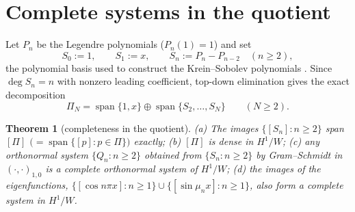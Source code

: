 ﻿\documentclass[11pt]{article}
\newtheorem{theorem}{Theorem}[section]
\begin{document}
\section{Complete systems in the quotient}

Let $P_n$ be the Legendre polynomials ($P_n(1)=1$) and set
\begin{equation*}
	S_0:=1,\qquad S_1:=x,\qquad S_n:=P_n-P_{n-2}\quad(n\ge 2),
\end{equation*}
the polynomial basis used to construct the Krein--Sobolev polynomials
\cite[eq.~(15)]{axioms}.  Since $\deg S_n=n$ with nonzero leading
coefficient, top-down elimination gives the exact decomposition
\begin{equation*}
	\Pi_N=\operatorname{span}\{1,x\}\oplus
	\operatorname{span}\{S_2,\ldots,S_N\}\qquad(N\ge2).
\end{equation*}

\begin{theorem}[completeness in the quotient]\label{thm:complete}
	(a) The images $\{[S_n]: n\ge 2\}$ span $[\Pi]$
	$\bigl(=\operatorname{span}\{[p]:p\in\Pi\}\bigr)$ exactly;
	(b) $[\Pi]$ is dense in $H^1/W$;
	(c) any orthonormal system $\{Q_n:n\ge 2\}$ obtained from
	$\{S_n:n\ge 2\}$ by Gram--Schmidt in $(\cdot,\cdot)_{1,0}$ is a complete
	orthonormal system of $H^1/W$;
	(d) the images of the eigenfunctions,
	$\{[\cos n\pi x]:n\ge 1\}\cup\{[\sin\mu_n x]:n\ge 1\}$, also form a
	complete system in $H^1/W$.
\end{theorem}
\end{document}
